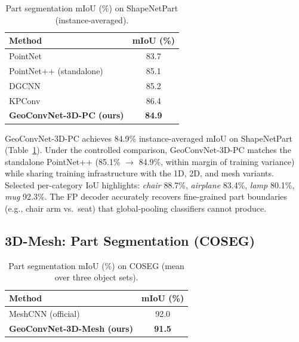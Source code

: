 \documentclass[10pt,conference]{IEEEtran}
\begin{document}
\begin{table}[t]
  \renewcommand{\arraystretch}{1.2}
  \caption{Part segmentation mIoU (\%) on ShapeNetPart (instance-averaged).}
  \label{tab:shapenet}
  \centering
  \begin{tabular}{lc}
    \toprule
    \textbf{Method} & \textbf{mIoU (\%)} \\
    \midrule
    PointNet~\cite{qi2017pointnet}                        & 83.7 \\
    PointNet++ (standalone)~\cite{qi2017pointnetplusplus} & 85.1 \\
    DGCNN~\cite{wang2019dgcnn}                            & 85.2 \\
    KPConv~\cite{thomas2019kpconv}                        & 86.4 \\
    \textbf{GeoConvNet-3D-PC (ours)}                      & \textbf{84.9} \\
    \bottomrule
  \end{tabular}
\end{table}

GeoConvNet-3D-PC achieves 84.9\% instance-averaged mIoU on ShapeNetPart
(Table~\ref{tab:shapenet}).  Under the controlled comparison, GeoConvNet-3D-PC
matches the standalone PointNet++ (85.1\% $\to$ 84.9\%, within margin of
training variance) while sharing training infrastructure with the 1D, 2D,
and mesh variants.  Selected per-category IoU highlights: \emph{chair}
88.7\%, \emph{airplane} 83.4\%, \emph{lamp} 80.1\%, \emph{mug} 92.3\%.
The FP decoder accurately recovers fine-grained part boundaries (e.g.,
chair arm vs.\ seat) that global-pooling classifiers cannot produce.

\subsection{3D-Mesh: Part Segmentation (COSEG)}

\begin{table}[t]
  \renewcommand{\arraystretch}{1.2}
  \caption{Part segmentation mIoU (\%) on COSEG (mean over three object sets).}
  \label{tab:coseg}
  \centering
  \begin{tabular}{lc}
    \toprule
    \textbf{Method} & \textbf{mIoU (\%)} \\
    \midrule
    MeshCNN (official)~\cite{hanocka2019meshcnn} & 92.0 \\
    \textbf{GeoConvNet-3D-Mesh (ours)}           & \textbf{91.5} \\
    \bottomrule
  \end{tabular}
\end{table}
\end{document}
